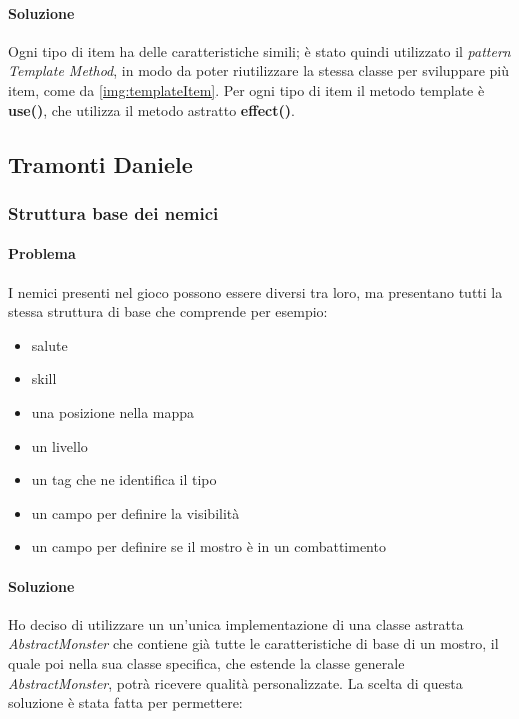 \documentclass{report}
\begin{document}
\paragraph{Soluzione} Ogni tipo di item ha delle caratteristiche simili; è stato quindi utilizzato il \textit{pattern Template Method}, in modo da poter riutilizzare la stessa classe per sviluppare più item, come da \ref{img:templateItem}.
%
Per ogni tipo di item il metodo template è \textbf{use()}, che utilizza il metodo astratto \textbf{effect()}. 

\clearpage
\subsection{Tramonti Daniele}

\subsubsection{Struttura base dei nemici}

\paragraph{Problema} I nemici presenti nel gioco possono essere diversi tra loro, ma presentano tutti la stessa struttura di base che comprende per esempio:

\begin{itemize}
    \item salute
    \item skill
    \item una posizione nella mappa
    \item un livello
    \item un tag che ne identifica il tipo
    \item un campo per definire la visibilità
    \item un campo per definire se il mostro è in un combattimento
\end{itemize}

\paragraph{Soluzione} Ho deciso di utilizzare un un'unica implementazione di una classe astratta \textit{AbstractMonster} che contiene già tutte le caratteristiche di base di un mostro, il quale poi nella sua classe
%
specifica, che estende la classe generale \textit{AbstractMonster}, potrà ricevere qualità personalizzate. La scelta di questa soluzione è stata fatta per permettere:
\end{document}
